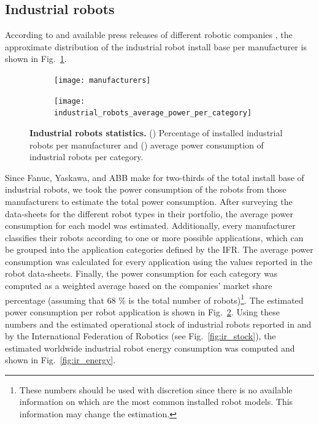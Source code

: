 \subsection{Industrial robots}
According to \cite{montaqim2015} and available press releases of different robotic companies \cite{fanuc2015, yaskawa2014, ABB2015}, the approximate distribution of the industrial robot install base per manufacturer is shown in Fig.~\ref{fig:manufacturers_pie}.
\begin{figure}[!h]
	\centering
	\hspace*{\fill}
	\begin{subfigure}[t]{0.45\textwidth}
		\subcaption{}
		\texttt{[image: manufacturers]}
		\label{fig:manufacturers_pie}
	\end{subfigure}
	\hfill
	\begin{subfigure}[t]{0.45\textwidth}
		\subcaption{}
		\texttt{[image: industrial\_robots\_average\_power\_per\_category]} \label{fig:ir_average_power}
	\end{subfigure}
	\hspace*{\fill}
	\caption[] {\label{fig:ir_statistics} \textbf{Industrial robots statistics.} () Percentage of installed industrial robots per manufacturer and () average power consumption of industrial robots per category.}
\end{figure}

Since Fanuc, Yaskawa, and ABB make for two-thirds of the total install base of industrial robots, we took the power consumption of the robots from those manufacturers to estimate the total power consumption. After surveying the data-sheets for the different robot types in their portfolio, the average power consumption for each model was estimated. Additionally, every manufacturer classifies their robots according to one or more possible applications, which can be grouped into the application categories defined by the IFR. The average power consumption was calculated for every application using the values reported in the robot data-sheets. Finally, the power consumption for each category was computed as a weighted average based on the companies' market share percentage (assuming that 68 \% is the total number of robots)\footnote[1]{These numbers should be used with discretion since there is no available information on which are the most common installed robot models. This information may change the estimation.}. The estimated power consumption per robot application is shown in Fig.~\ref{fig:ir_average_power}. Using these numbers and the estimated operational stock of industrial robots reported in \cite{statista_ir_operational_stock} and by the International Federation of Robotics (see Fig.~\ref{fig:ir_stock}), the estimated worldwide industrial robot energy consumption was computed and shown in Fig.~\ref{fig:ir_energy}.

